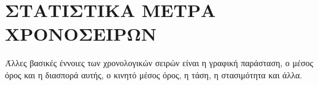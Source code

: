 \section{ΣΤΑΤΙΣΤΙΚΑ ΜΕΤΡΑ ΧΡΟΝΟΣΕΙΡΩΝ}

Άλλες βασικές έννοιες των χρονολογικών σειρών είναι η γραφική παράσταση,
ο μέσος όρος και η διασπορά αυτής, ο κινητό μέσος όρος, η τάση, η στασιμότητα και
άλλα.\\


